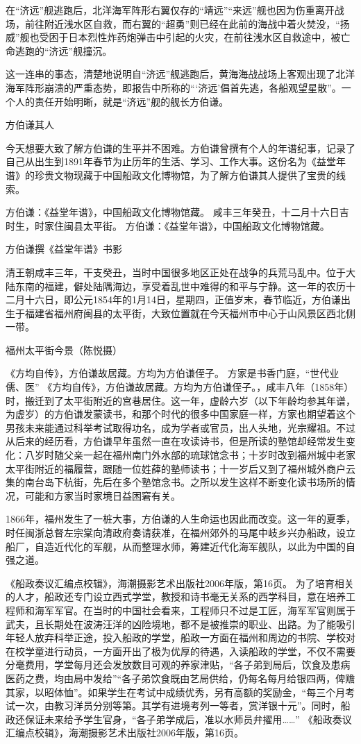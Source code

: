 \documentclass[12pt,UTF8]{ctexbook}
\begin{document}
在“济远”舰逃跑后，北洋海军阵形右翼仅存的“靖远”“来远”舰也因为伤重离开战场，前往附近浅水区自救，而右翼的“超勇”则已经在此前的海战中着火焚没，“扬威”舰也受困于日本烈性炸药炮弹击中引起的火灾，在前往浅水区自救途中，被亡命逃跑的“济远”舰撞沉。

这一连串的事态，清楚地说明自“济远”舰逃跑后，黄海海战战场上客观出现了北洋海军阵形崩溃的严重态势，即报告中所称的“‘济远’倡首先逃，各船观望星散”。一个人的责任开始明晰，就是“济远”舰的舰长方伯谦。

方伯谦其人

今天想要大致了解方伯谦的生平并不困难。方伯谦曾撰有个人的年谱纪事，记录了自己从出生到1891年春节为止历年的生活、学习、工作大事。这份名为《益堂年谱》的珍贵文物现藏于中国船政文化博物馆，为了解方伯谦其人提供了宝贵的线索。

方伯谦：《益堂年谱》，中国船政文化博物馆藏。
咸丰三年癸丑，十二月十六日吉时生，时家住闽县太平街。 方伯谦：《益堂年谱》，中国船政文化博物馆藏。


方伯谦撰《益堂年谱》书影

清王朝咸丰三年，干支癸丑，当时中国很多地区正处在战争的兵荒马乱中。位于大陆东南的福建，僻处陆隅海边，享受着乱世中难得的和平与宁静。这一年的农历十二月十六日，即公元1854年的1月14日，星期四，正值岁末，春节临近，方伯谦出生于福建省福州府闽县的太平街，大致位置就在今天福州市中心于山风景区西北侧一带。


福州太平街今景（陈悦摄）

《方均自传》，方伯谦故居藏。方均为方伯谦侄子。
方家是书香门庭，“世代业儒、医” 《方均自传》，方伯谦故居藏。方均为方伯谦侄子。，咸丰八年（1858年）时，搬迁到了太平街附近的宫巷居住。这一年，虚龄六岁（以下年龄均参其年谱，为虚岁）的方伯谦发蒙读书，和那个时代的很多中国家庭一样，方家也期望着这个男孩未来能通过科举考试取得功名，成为学者或官员，出人头地，光宗耀祖。不过从后来的经历看，方伯谦早年虽然一直在攻读诗书，但是所读的塾馆却经常发生变化：八岁时随父亲一起在福州南门外水部的琉球馆念书；十岁时改到福州城中老家太平街附近的福履营，跟随一位姓薛的塾师读书；十一岁后又到了福州城外商户云集的南台岛下杭街，先后在多个塾馆念书。之所以发生这样不断变化读书场所的情况，可能和方家当时家境日益困窘有关。

1866年，福州发生了一桩大事，方伯谦的人生命运也因此而改变。这一年的夏季，时任闽浙总督左宗棠向清政府奏请获准，在福州郊外的马尾中岐乡兴办船政，设立船厂，自造近代化的军舰，从而整理水师，筹建近代化海军舰队，以此为中国的自强之道。

《船政奏议汇编点校辑》，海潮摄影艺术出版社2006年版，第16页。
为了培育相关的人才，船政还专门设立西式学堂，教授和诗书毫无关系的西学科目，意在培养工程师和海军军官。在当时的中国社会看来，工程师只不过是工匠，海军军官则属于武夫，且长期处在波涛汪洋的凶险境地，都不是被推崇的职业、出路。为了能吸引年轻人放弃科举正途，投入船政的学堂，船政一方面在福州和周边的书院、学校对在校学童进行动员，一方面开出了极为优厚的待遇，入读船政的学堂，不仅不需要分毫费用，学堂每月还会发放数目可观的养家津贴，“各子弟到局后，饮食及患病医药之费，均由局中发给”“各子弟饮食既由艺局供给，仍每名每月给银四两，俾赡其家，以昭体恤”。如果学生在考试中成绩优秀，另有高额的奖励金，“每三个月考试一次，由教习洋员分别等第。其学有进境考列一等者，赏洋银十元”。同时，船政还保证未来给予学生官身，“各子弟学成后，准以水师员弁擢用……” 《船政奏议汇编点校辑》，海潮摄影艺术出版社2006年版，第16页。
\end{document}
